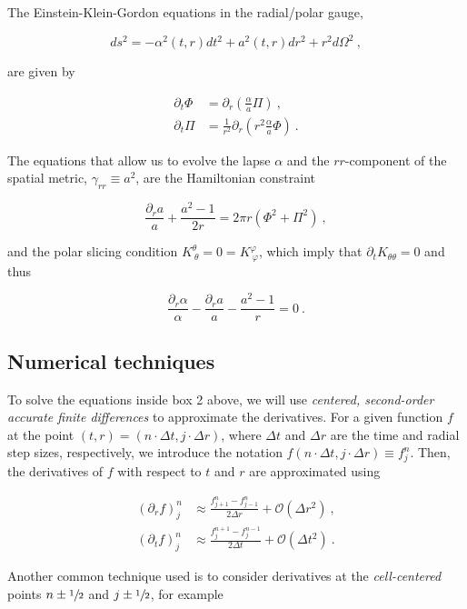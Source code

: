 \documentclass[a4paper,11pt]{article}
\renewcommand{\a}{\alpha}
\newcommand{\g}{\gamma}
\newcommand{\gDD}[2]{\g_{{#1}{#2}}}
\newcommand{\pd}{\partial}
\newcommand{\nn}{\nonumber}
\newcommand{\dt}{\Delta t}
\newcommand{\dr}{\Delta r}
\newcommand{\order}[2]{\mathcal{O}\lrpar{#1^{#2}}}
\newcommand{\lrpar}[1]{\left( #1 \right)}
\newcommand{\n}{\noindent}
\newcommand{\eq}[1]{
  \begin{equation}
    #1
  \end{equation}
}
\newcommand{\spl}[1]{
  \begin{split}
    #1
  \end{split}
}
\newcommand{\al}[1]{
  \begin{align}
    #1
  \end{align}
}
\newcommand{\parboxbreak}[2]{
  
  \vspace*{0.25in}
  
  \begin{tcolorbox}[breakable, pad at break=1mm, before=\centering,title=Box #1,colback=blue!5!white,colframe=gray!75!black]
    #2
  \end{tcolorbox}

  \vspace*{0.25in}

}
\begin{document}
\parboxbreak{2: The EKG+ADM equations in the radial/polar gauge}{

  The Einstein-Klein-Gordon equations in the radial/polar gauge,

  \eq{ ds^{2} = -\a^{2}\lrpar{t,r}dt^{2} + a^{2}\lrpar{t,r}dr^{2} + r^{2}d\Omega^{2}\ , \nn}

  \n are given by

  \al{
    \pd_{t}\Phi &= \pd_{r}\lrpar{\frac{\a}{a}\Pi}\ ,\nn\\
    \pd_{t}\Pi  &= \frac{1}{r^{2}}\pd_{r}\lrpar{r^{2}\frac{\a}{a}\Phi}\ . \nn
  }

  \n The equations that allow us to evolve the lapse $\a$ and the $rr$-component of the spatial metric, $\gDD{r}{r} \equiv a^{2}$, are the Hamiltonian constraint

  \eq{ \frac{\pd_{r}a}{a} + \frac{a^{2}-1}{2r} = 2\pi r\lrpar{\Phi^{2} + \Pi^{2}}\ , \nn }

  \n and the polar slicing condition $K^{\theta}_{\ \theta} = 0 = K^{\varphi}_{\ \varphi}$, which imply that $\pd_{t}K_{\theta\theta} = 0$ and thus

  \eq{ \frac{\pd_{r}\a}{\a} - \frac{\pd_{r}a}{a} - \frac{a^{2}-1}{r} = 0\ . \nn}
  
}

\subsection{Numerical techniques}

\begin{sloppypar}
To solve the equations inside box 2 above, we will use \emph{centered, second-order accurate finite differences} to approximate the derivatives. For a given function $f$ at the point ${(t,r)=(n\cdot\dt,j\cdot\dr)}$, where $\dt$ and $\dr$ are the time and radial step sizes, respectively, we introduce the notation $f(n\cdot\dt,j\cdot\dr) \equiv f^{n}_{j}$. Then, the derivatives of $f$ with respect to $t$ and $r$ are approximated using
\end{sloppypar}

\eq{
  \spl{
    \lrpar{\pd_{r}f}^{n}_{j} &\approx \frac{f^{n}_{j+1} - f^{n}_{j-1}}{2\dr} + \order{\dr}{2}\ ,\\
    \lrpar{\pd_{t}f}^{n}_{j} &\approx \frac{f^{n+1}_{j} - f^{n-1}_{j}}{2\dt} + \order{\dt}{2}\ .
  }
}

\n Another common technique used is to consider derivatives at the \emph{cell-centered} points $n\pm\sfrac{1}{2}$ and $j\pm\sfrac{1}{2}$, for example
\end{document}
